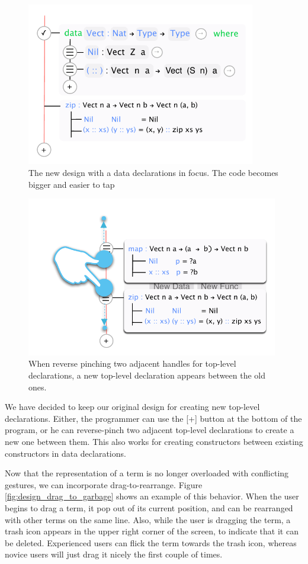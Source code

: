 \begin{figure}
	\centering
		\includegraphics[width=100mm]{diagrams/final_design_top_dec_in_focus.pdf}
	\caption{The new design with a data declarations in focus. The code becomes
	bigger and easier to tap}
\label{fig:new_design_data_in_focus}
\end{figure}

\begin{figure}
	\centering
		\includegraphics[width=110mm]{diagrams/new_function_reverse_pinch.pdf}
	\caption{When reverse pinching two adjacent handles for top-level
	declarations, a new top-level declaration appears between the old ones.}
\label{fig:new_function_reverse_pinch}
\end{figure}

We have decided to keep our original design for creating new top-level
declarations. Either, the programmer can use the [+] button at the bottom of
the program, or he can reverse-pinch two adjacent top-level declarations to
create a new one between them. This also works for creating constructors
between existing constructors in data declarations.

Now that the representation of a term is no longer overloaded with conflicting
gestures, we can incorporate drag-to-rearrange. Figure \ref{fig:design_drag_to_garbage}
shows an example of this behavior. When the user begins to drag a term, it pop
out of its current position, and can be rearranged with other terms on the same
line. Also, while the user is dragging the term, a trash icon appears in the
upper right corner of the screen, to indicate that it can be deleted. Experienced users can flick the term towards the trash icon, whereas novice users will just drag it nicely
the first couple of times.

